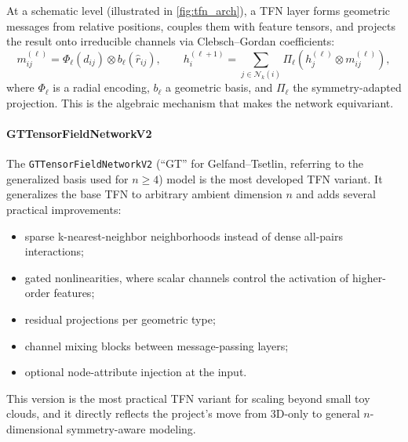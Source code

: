 \documentclass[a4paper,11pt]{article}
\begin{document}
At a schematic level (illustrated in \cref{fig:tfn_arch}), a TFN layer forms geometric messages from relative positions, couples them with feature tensors, and projects the result onto irreducible channels via Clebsch--Gordan coefficients:
\[
m_{ij}^{(\ell)} = \Phi_\ell(d_{ij}) \otimes b_\ell(\hat r_{ij}),
\qquad
h_i^{(\ell+1)} = \sum_{j\in\mathcal N_k(i)} \Pi_\ell\!\left(h_j^{(\ell)} \otimes m_{ij}^{(\ell)}\right),
\]
where $\Phi_\ell$ is a radial encoding, $b_\ell$ a geometric basis, and $\Pi_\ell$ the symmetry-adapted projection.
This is the algebraic mechanism that makes the network equivariant.

\paragraph{GTTensorFieldNetworkV2}
The \texttt{GTTensorFieldNetworkV2} (``GT'' for Gelfand--Tsetlin, referring to the generalized basis used for $n\ge 4$) model is the most developed TFN variant.
It generalizes the base TFN to arbitrary ambient dimension $n$ and adds several practical improvements:
\begin{itemize}
    \item sparse k-nearest-neighbor neighborhoods instead of dense all-pairs interactions;
    \item gated nonlinearities, where scalar channels control the activation of higher-order features;
    \item residual projections per geometric type;
    \item channel mixing blocks between message-passing layers;
    \item optional node-attribute injection at the input.
\end{itemize}
This version is the most practical TFN variant for scaling beyond small toy clouds, and it directly reflects the project's move from 3D-only to general $n$-dimensional symmetry-aware modeling.
\end{document}
